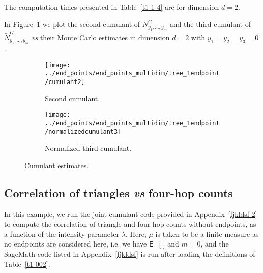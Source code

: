 \documentclass[12pt]{article}
\newcommand{\EE}{\mathsf{E}}
\numberwithin{equation}{section}
\begin{document}
\vspace{-0.4cm}

\noindent
The computation times presented in 
Table~\ref{t1-1-4} are for dimension $d=2$.
 
\vspace{-0.2cm}

\begin{table}[H] 
  \centering
\scriptsize %
{}
\caption{Computation times and counts of connected non-flat {\em vs} all partitions in $\Pi ([n]\times[4])$.} 
\label{t1-1-4}
\end{table} 

\vspace{-0.4cm}

\noindent
In Figure~\ref{fig2-11-2} we plot the
second cumulant of ${N}_{y_1,\ldots , y_m}^G$ 
and the third cumulant of  $\widetilde{N}_{y_1,\ldots , y_m}^G$
 {\em vs} their Monte Carlo estimates
 in dimension $d=2$ with $y_1 = y_2 = y_3 = 0$. 

 \begin{figure}[H]
  \centering
 \begin{subfigure}[b]{0.50\textwidth}
 \hskip-0.5cm
    \texttt{[image: ../end\_points/end\_points\_multidim/tree\_1endpoint/cumulant2]} 
    \caption{Second cumulant.} 
 \end{subfigure}
  \centering
  \begin{subfigure}[b]{0.49\textwidth}
  \hskip-0.3cm
    \texttt{[image: ../end\_points/end\_points\_multidim/tree\_1endpoint/normalizedcumulant3]} 
    \caption{Normalized third cumulant.} 
 \end{subfigure}
\caption{Cumulant estimates.} 
\label{fig2-11-2} 
\end{figure}

\subsection{Correlation of triangles {\em vs} four-hop counts} 
\noindent
In this example, we run the joint cumulant code provided
in Appendix~\ref{fjkldsf-2}
to compute the correlation of triangle and four-hop counts
without endpoints, as a function of the intensity parameter $\lambda$.
 Here, $\mu$ is taken to be a finite measure
 as no endpoints are considered here, i.e.
 we have $\EE$=[ \hskip0.03cm ] and $m=0$,
 and the SageMath code listed in 
 Appendix~\ref{fjkldsf} is run after loading the definitions
 of Table~\ref{t1-002}. 
 
\end{document}
